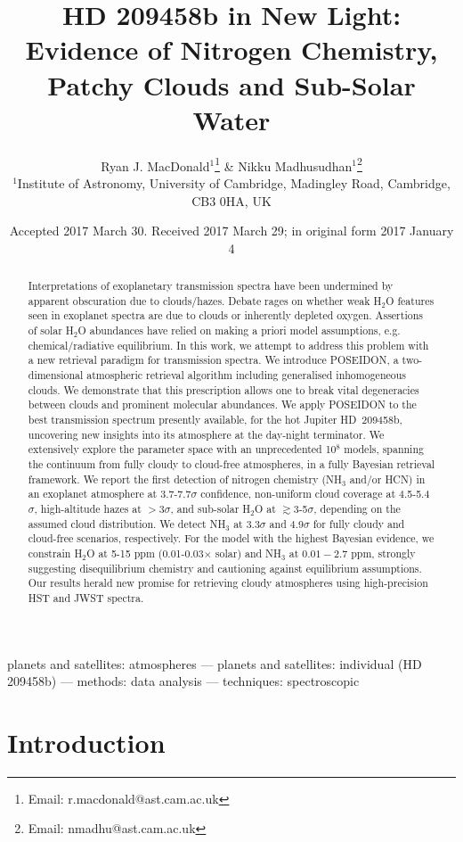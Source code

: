 \documentclass[fleqn,usenatbib]{mnras}
\title[HD 209458b in New Light]{HD 209458b in New Light: Evidence of Nitrogen Chemistry, Patchy Clouds and Sub-Solar Water}
\author[MacDonald \& Madhusudhan]{
Ryan J. MacDonald$^{1}$\thanks{Email: r.macdonald@ast.cam.ac.uk}
\& Nikku Madhusudhan$^{1}$\thanks{Email: nmadhu@ast.cam.ac.uk}
\\
$^{1}$Institute of Astronomy, University of Cambridge, Madingley Road, Cambridge, CB3 0HA, UK
}
\date{Accepted 2017 March 30. Received 2017 March 29; in original form 2017 January 4}
\begin{document}
\label{firstpage}
\pagerange{\pageref{firstpage}--\pageref{lastpage}}
\maketitle

\begin{abstract}
Interpretations of exoplanetary transmission spectra have been undermined by apparent obscuration due to clouds/hazes. Debate rages on whether weak H$_2$O features seen in exoplanet spectra are due to clouds or inherently depleted oxygen. Assertions of solar H$_2$O abundances have relied on making a priori model assumptions, e.g. chemical/radiative equilibrium. In this work, we attempt to address this problem with a new retrieval paradigm for transmission spectra. We introduce POSEIDON, a two-dimensional atmospheric retrieval algorithm including generalised inhomogeneous clouds. We demonstrate that this prescription allows one to break vital degeneracies between clouds and prominent molecular abundances. We apply POSEIDON to the best transmission spectrum presently available, for the hot Jupiter HD~209458b, uncovering new insights into its atmosphere at the day-night terminator. We extensively explore the parameter space with an unprecedented 10$^8$ models, spanning the continuum from fully cloudy to cloud-free atmospheres, in a fully Bayesian retrieval framework. We report the first detection of nitrogen chemistry (NH$_3$ and/or HCN) in an exoplanet atmosphere at 3.7-7.7$\sigma$ confidence, non-uniform cloud coverage at 4.5-5.4$\sigma$, high-altitude hazes at $>$3$\sigma$, and sub-solar H$_2$O at $\gtrsim$3-5$\sigma$, depending on the assumed cloud distribution. We detect NH$_3$ at 3.3$\sigma$ and 4.9$\sigma$ for fully cloudy and cloud-free scenarios, respectively. For the model with the highest Bayesian evidence, we constrain H$_2$O at 5-15 ppm (0.01-0.03$\times$ solar) and NH$_3$ at $0.01-2.7$ ppm, strongly suggesting disequilibrium chemistry and cautioning against equilibrium assumptions. Our results herald new promise for retrieving cloudy atmospheres using high-precision HST and JWST spectra. 
\end{abstract}

\begin{keywords}
planets and satellites: atmospheres --- planets and satellites: individual (HD 209458b) --- methods: data analysis --- techniques: spectroscopic
\end{keywords}

\section{Introduction}\label{Intro}
\end{document}
